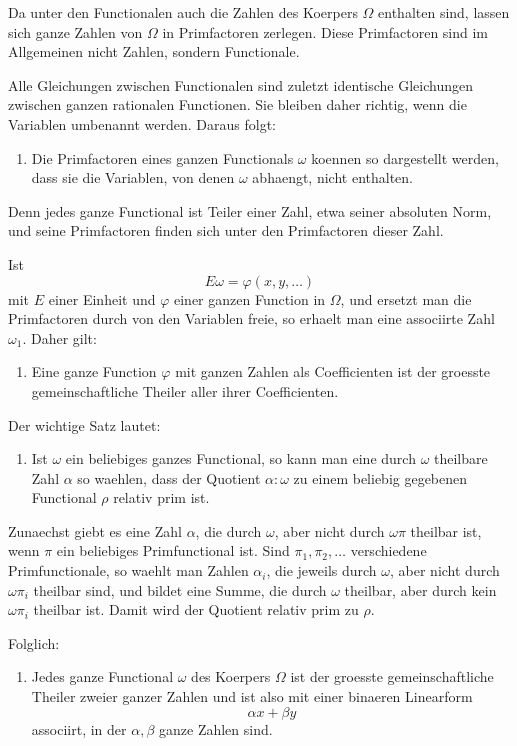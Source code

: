 \documentclass[11pt]{article}
\begin{document}
Da unter den Functionalen auch die Zahlen des Koerpers \(\Omega\)
enthalten sind, lassen sich ganze Zahlen von \(\Omega\) in
Primfactoren zerlegen. Diese Primfactoren sind im Allgemeinen nicht
Zahlen, sondern Functionale.

Alle Gleichungen zwischen Functionalen sind zuletzt identische
Gleichungen zwischen ganzen rationalen Functionen. Sie bleiben daher
richtig, wenn die Variablen umbenannt werden. Daraus folgt:
\begin{enumerate}[label=\arabic*.]
\item Die Primfactoren eines ganzen Functionals \(\omega\) koennen so
dargestellt werden, dass sie die Variablen, von denen \(\omega\)
abhaengt, nicht enthalten.
\end{enumerate}
Denn jedes ganze Functional ist Teiler einer Zahl, etwa seiner
absoluten Norm, und seine Primfactoren finden sich unter den
Primfactoren dieser Zahl.

Ist
\[
E\omega=\varphi(x,y,\ldots)
\tag{1}
\]
mit \(E\) einer Einheit und \(\varphi\) einer ganzen Function in
\(\Omega\), und ersetzt man die Primfactoren durch von den Variablen
freie, so erhaelt man eine associirte Zahl \(\omega_1\). Daher gilt:
\begin{enumerate}[label=\arabic*,resume]
\item Eine ganze Function \(\varphi\) mit ganzen Zahlen als
Coefficienten ist der groesste gemeinschaftliche Theiler aller ihrer
Coefficienten.
\end{enumerate}

Der wichtige Satz lautet:
\begin{enumerate}[label=\arabic*,resume]
\item Ist \(\omega\) ein beliebiges ganzes Functional, so kann man
eine durch \(\omega\) theilbare Zahl \(\alpha\) so waehlen, dass der
Quotient \(\alpha:\omega\) zu einem beliebig gegebenen Functional
\(\rho\) relativ prim ist.
\end{enumerate}
Zunaechst giebt es eine Zahl \(\alpha\), die durch \(\omega\), aber
nicht durch \(\omega\pi\) theilbar ist, wenn \(\pi\) ein beliebiges
Primfunctional ist. Sind
\(\pi_1,\pi_2,\ldots\) verschiedene Primfunctionale, so waehlt man
Zahlen \(\alpha_i\), die jeweils durch \(\omega\), aber nicht durch
\(\omega\pi_i\) theilbar sind, und bildet eine Summe, die durch
\(\omega\) theilbar, aber durch kein \(\omega\pi_i\) theilbar ist.
Damit wird der Quotient relativ prim zu \(\rho\).

Folglich:
\begin{enumerate}[label=\arabic*,resume]
\item Jedes ganze Functional \(\omega\) des Koerpers \(\Omega\) ist
der groesste gemeinschaftliche Theiler zweier ganzer Zahlen und ist
also mit einer binaeren Linearform
\[
\alpha x+\beta y
\]
associirt, in der \(\alpha,\beta\) ganze Zahlen sind.
\end{enumerate}
\end{document}
